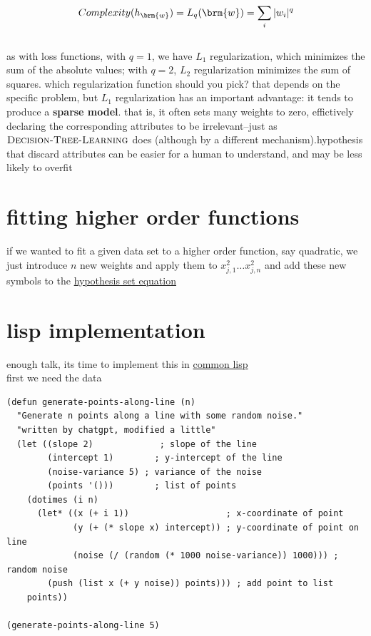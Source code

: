 \documentclass[a4paper,12pt]{article}
\begin{document}
\[
Complexity(h_{\brm{w}}) = L_q(\brm{w}) = \sum_{i} |w_i|^q
\]\\
as with loss functions, with \(q=1\), we have \(L_1\) regularization, which minimizes the sum of the absolute values; with \(q=2\), \(L_2\) regularization minimizes the sum of squares. which regularization function should you pick? that depends on the specific problem, but \(L_1\) regularization has an important advantage: it tends to produce a \textbf{sparse model}. that is, it often sets many weights to zero, effictively declaring the corresponding attributes to be irrelevant--just as \(\textsc{Decision-Tree-Learning}\) does (although by a different mechanism).hypothesis that discard attributes can be easier for a human to understand, and may be less likely to overfit\\
\section{fitting higher order functions}
\label{sec:orgba747a1}
if we wanted to fit a given data set to a higher order function, say quadratic, we just introduce \(n\) new weights and apply them to \(x_{j,1}^2 \dots x_{j,n}^2\) and add these new symbols to the \hyperref[org2756fe9]{hypothesis set equation}\\
\section{lisp implementation}
\label{sec:orgf370cb8}
enough talk, its time to implement this in \href{20230224163920-common_lisp.org}{common lisp}\\
first we need the data\\
\lstset{language=Lisp,label= ,caption= ,captionpos=b,numbers=none}
\begin{lstlisting}
(defun generate-points-along-line (n)
  "Generate n points along a line with some random noise."
  "written by chatgpt, modified a little"
  (let ((slope 2)             ; slope of the line
        (intercept 1)        ; y-intercept of the line
        (noise-variance 5) ; variance of the noise
        (points '()))        ; list of points
    (dotimes (i n)
      (let* ((x (+ i 1))                   ; x-coordinate of point
             (y (+ (* slope x) intercept)) ; y-coordinate of point on line
             (noise (/ (random (* 1000 noise-variance)) 1000))) ; random noise
        (push (list x (+ y noise)) points))) ; add point to list
    points))

(generate-points-along-line 5)
\end{lstlisting}
\end{document}
